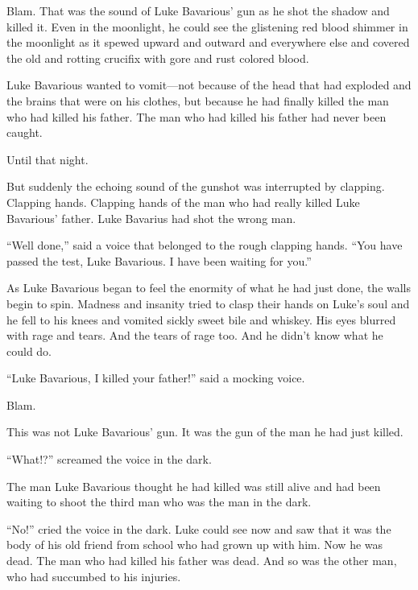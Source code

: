 Blam. That was the sound of Luke Bavarious' gun as he shot
the shadow and killed it. Even in the moonlight, he could see the
glistening red blood shimmer in the moonlight as it spewed upward
and outward and everywhere else and covered the old and rotting
crucifix with gore and rust colored blood.



Luke Bavarious wanted to vomit---not because of the head that
had exploded and the brains that were on his clothes, but because
he had finally killed the man who had killed his father. The man
who had killed his father had never been caught.



Until that night.



But suddenly the echoing sound of the gunshot was interrupted by
clapping. Clapping hands. Clapping hands of the man who had really
killed Luke Bavarious' father. Luke Bavarius had shot the
wrong man.



``Well done,'' said a voice that belonged to the rough
clapping hands. ``You have passed the test, Luke Bavarious. I
have been waiting for you.''



As Luke Bavarious began to feel the enormity of what he had just
done, the walls begin to spin. Madness and insanity tried to clasp
their hands on Luke's soul and he fell to his knees and
vomited sickly sweet bile and whiskey. His eyes blurred with rage
and tears. And the tears of rage too. And he didn't know what
he could do.



``Luke Bavarious, I killed your father!'' said a mocking
voice.



Blam.



This was not Luke Bavarious' gun. It was the gun of the man
he had just killed.



``What!?'' screamed the voice in the dark.



The man Luke Bavarious thought he had killed was still alive and
had been waiting to shoot the third man who was the man in the
dark.



``No!'' cried the voice in the dark. Luke could see now
and saw that it was the body of his old friend from school who had
grown up with him. Now he was dead. The man who had killed his
father was dead. And so was the other man, who had succumbed to his
injuries.



